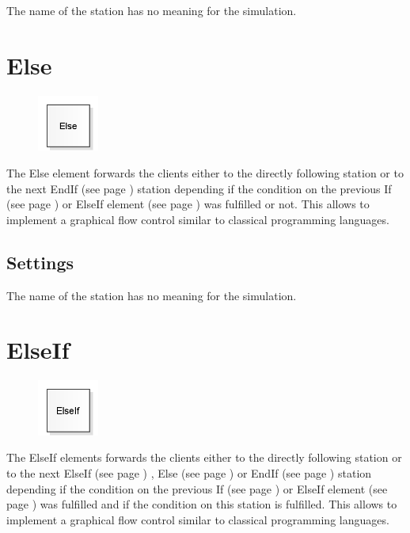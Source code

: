 The name of the station has no meaning for the simulation.


\section{Else}
\label{ref:ModelElementLogicElse}

\begin{figure}
\vspace{-22pt}
\includegraphics[width=2cm]{imageModelElementLogicElse.png}
\vspace{-22pt}
\end{figure}

The Else element forwards the clients either to the directly following station or to the
next EndIf (see page \pageref{ref:ModelElementLogicEndIf}) station depending if the condition
on the previous If (see page \pageref{ref:ModelElementLogicIf}) or
ElseIf element (see page \pageref{ref:ModelElementLogicElseIf}) was fulfilled or not.
This allows to implement a graphical flow control similar to classical programming
languages.

\subsection*{Settings}

The name of the station has no meaning for the simulation.


\section{ElseIf}
\label{ref:ModelElementLogicElseIf}

\begin{figure}
\vspace{-22pt}
\includegraphics[width=2cm]{imageModelElementLogicElseIf.png}
\vspace{-22pt}
\end{figure}

The ElseIf elements forwards the clients either to the directly following station or to the
next ElseIf (see page \pageref{ref:ModelElementLogicElseIf}) ,
Else (see page \pageref{ref:ModelElementLogicElse}) or
EndIf (see page \pageref{ref:ModelElementLogicEndIf}) station depending if the condition
on the previous If (see page \pageref{ref:ModelElementLogicIf}) or
ElseIf element (see page \pageref{ref:ModelElementLogicElseIf}) was fulfilled and if the
condition on this station is fulfilled.
This allows to implement a graphical flow control similar to classical programming
languages.	

